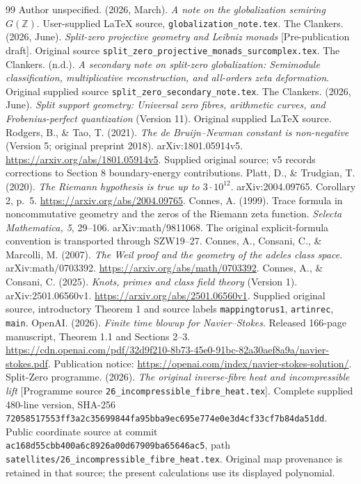 \documentclass[11pt,a4paper]{article}
\theoremstyle{definition}\newtheorem{definition}[theorem]{Definition}\newtheorem{remark}[theorem]{Remark}
\begin{document}
\begin{thebibliography}{99}
 Author unspecified. (2026, March). \emph{A note on the globalization semiring $G(\mathbb Z)$}. User-supplied LaTeX source, \texttt{globalization\_note.tex}.
 The Clankers. (2026, June). \emph{Split-zero projective geometry and Leibniz monads} [Pre-publication draft]. Original source \texttt{split\_zero\_projective\_monads\_surcomplex.tex}.
 The Clankers. (n.d.). \emph{A secondary note on split-zero globalization: Semimodule classification, multiplicative reconstruction, and all-orders zeta deformation}. Original supplied source \texttt{split\_zero\_secondary\_note.tex}.
 The Clankers. (2026, June). \emph{Split support geometry: Universal zero fibres, arithmetic curves, and Frobenius-perfect quantization} (Version 11). Original supplied LaTeX source.
 Rodgers, B., \& Tao, T. (2021). \emph{The de Bruijn--Newman constant is non-negative} (Version 5; original preprint 2018). arXiv:1801.05914v5. \url{https://arxiv.org/abs/1801.05914v5}. Supplied original source; v5 records corrections to Section 8 boundary-energy contributions.
 Platt, D., \& Trudgian, T. (2020). \emph{The Riemann hypothesis is true up to $3\cdot10^{12}$}. arXiv:2004.09765. Corollary 2, p.~5. \url{https://arxiv.org/abs/2004.09765}.
 Connes, A. (1999). Trace formula in noncommutative geometry and the zeros of the Riemann zeta function. \emph{Selecta Mathematica, 5}, 29--106. arXiv:math/9811068. The original explicit-formula convention is transported through SZW19--27.
 Connes, A., Consani, C., \& Marcolli, M. (2007). \emph{The Weil proof and the geometry of the adeles class space}. arXiv:math/0703392. \url{https://arxiv.org/abs/math/0703392}.
 Connes, A., \& Consani, C. (2025). \emph{Knots, primes and class field theory} (Version 1). arXiv:2501.06560v1. \url{https://arxiv.org/abs/2501.06560v1}. Supplied original source, introductory Theorem 1 and source labels \texttt{mappingtorus1}, \texttt{artinrec}, \texttt{main}.
 OpenAI. (2026). \emph{Finite time blowup for Navier--Stokes}. Released 166-page manuscript, Theorem 1.1 and Sections 2--3. \url{https://cdn.openai.com/pdf/32d9f210-8b73-45e0-91bc-82a30aef8a9a/navier-stokes.pdf}. Publication notice: \url{https://openai.com/index/navier-stokes-solution/}.
 Split-Zero programme. (2026). \emph{The original inverse-fibre heat and incompressible lift} [Programme source \texttt{26\_incompressible\_fibre\_heat.tex}]. Complete supplied 480-line version, SHA-256 \texttt{72058517553ff3a2c35699844fa95bba9ec695e774e0e3d4cf33cf7b84da51dd}. Public coordinate source at commit \texttt{ac168d55cbb400a6c8926a00d67909ba65646ac5}, path \texttt{satellites/26\_incompressible\_fibre\_heat.tex}. Original map provenance is retained in that source; the present calculations use its displayed polynomial.

\end{thebibliography}
\end{document}
